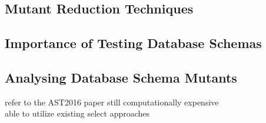 \documentclass[conference]{IEEEtran}
\begin{document}
\subsection{Mutant Reduction Techniques}
%
%
%

\subsection{Importance of Testing Database Schemas}
\subsection{Analysing Database Schema Mutants}
refer to the AST2016 paper
still computationally expensive\\
able to utilize existing select approaches
\end{document}

